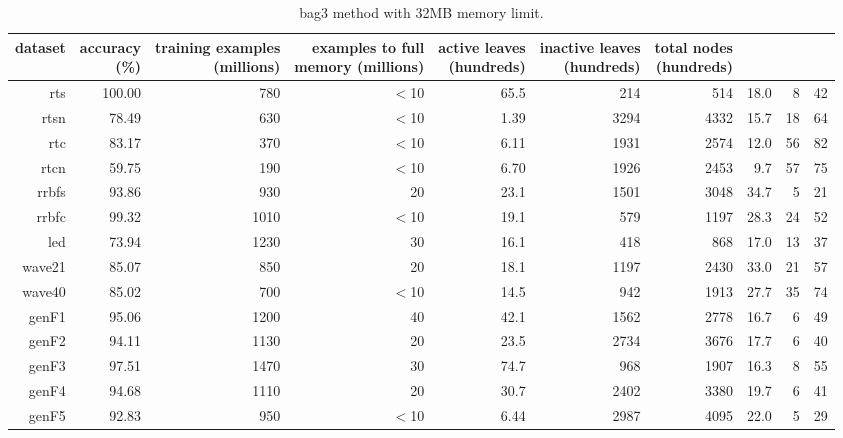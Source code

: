 \clearpage
\begin{table}
\caption{{\sc bag3} method with 32MB memory limit.}
\label{tab:bag3-32MB}
\centering
\begin{tabular}{|r|r|r|r|r|r|r|r|r|r|}
\hline
dataset	&
\rotatebox{90}{\parbox{9em}{accuracy\\(\%)}} &
\rotatebox{90}{\parbox{9em}{training examples\\(millions)}} &
\rotatebox{90}{\parbox{9em}{examples to full\\memory (millions)}} &
\rotatebox{90}{\parbox{9em}{active leaves\\(hundreds)}} &
\rotatebox{90}{\parbox{9em}{inactive leaves\\(hundreds)}} &
\rotatebox{90}{\parbox{9em}{total nodes\\(hundreds)}} &
\rotatebox{90}{\parbox{9em}{average tree depth}}	&
\rotatebox{90}{\parbox{9em}{training speed (\%)}} &
\rotatebox{90}{\parbox{9em}{prediction speed (\%)}} \\
\hline
{\sc rts} & 100.00 & 780 & $<$10 & 65.5 & 214 & 514 & 18.0 & 8 & 42 \\
{\sc rtsn} & 78.49 & 630 & $<$10 & 1.39 & 3294 & 4332 & 15.7 & 18 & 64 \\
{\sc rtc} & 83.17 & 370 & $<$10 & 6.11 & 1931 & 2574 & 12.0 & 56 & 82 \\
{\sc rtcn} & 59.75 & 190 & $<$10 & 6.70 & 1926 & 2453 & 9.7 & 57 & 75 \\
{\sc rrbfs} & 93.86 & 930 & 20 & 23.1 & 1501 & 3048 & 34.7 & 5 & 21 \\
{\sc rrbfc} & 99.32 & 1010 & $<$10 & 19.1 & 579 & 1197 & 28.3 & 24 & 52 \\
{\sc led} & 73.94 & 1230 & 30 & 16.1 & 418 & 868 & 17.0 & 13 & 37 \\
{\sc wave21} & 85.07 & 850 & 20 & 18.1 & 1197 & 2430 & 33.0 & 21 & 57 \\
{\sc wave40} & 85.02 & 700 & $<$10 & 14.5 & 942 & 1913 & 27.7 & 35 & 74 \\
{\sc genF1} & 95.06 & 1200 & 40 & 42.1 & 1562 & 2778 & 16.7 & 6 & 49 \\
{\sc genF2} & 94.11 & 1130 & 20 & 23.5 & 2734 & 3676 & 17.7 & 6 & 40 \\
{\sc genF3} & 97.51 & 1470 & 30 & 74.7 & 968 & 1907 & 16.3 & 8 & 55 \\
{\sc genF4} & 94.68 & 1110 & 20 & 30.7 & 2402 & 3380 & 19.7 & 6 & 41 \\
{\sc genF5} & 92.83 & 950 & $<$10 & 6.44 & 2987 & 4095 & 22.0 & 5 & 29 \\

\end{tabular}
\end{table}
